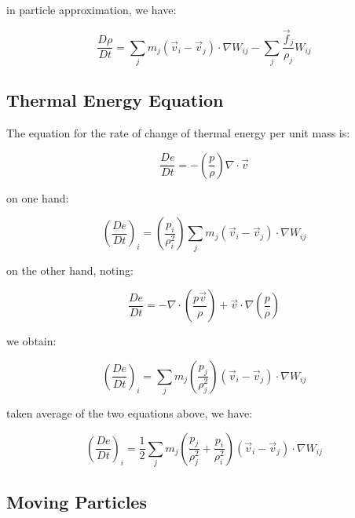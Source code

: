 \documentclass[10pt, oneside]{article}
\begin{document}
in particle approximation, we have:

\begin{equation}
    \frac{D\rho}{Dt}=\sum_j m_j (\vec{v}_i-\vec{v}_j)\cdot \nabla W_{ij}-\sum_j \frac{\vec{f}_j}{\rho_j}W_{ij}
\end{equation}

\subsection{Thermal Energy Equation}

The equation for the rate of change of thermal energy per unit mass is:

\begin{equation}
    \frac{D e}{Dt}=-\left(
        \frac{p}{\rho}
    \right)\nabla\cdot \vec{v}
\end{equation}

on one hand:

\begin{equation}
    \left(\frac{De}{Dt}\right)_i=
    \left(
        \frac{p_i}{\rho_i^2}
    \right)\sum_j
    m_j(\vec{v}_i-\vec{v}_j)\cdot \nabla W_{ij}
\end{equation}

on the other hand, noting:

\begin{equation}
    \frac{De}{Dt} = 
    -\nabla\cdot\left(
        \frac{p\vec{v}}{\rho}
    \right) + \vec{v}\cdot
    \nabla\left(
        \frac{p}{\rho}
    \right)
\end{equation}

we obtain:

\begin{equation}
    \left(\frac{De}{Dt}\right)_i=
    \sum_j m_j
    \left(
        \frac{p_j}{\rho_j^2}
    \right)(\vec{v}_i-\vec{v}_j)\cdot \nabla W_{ij}
\end{equation}

taken average of the two equations above, we have:

\begin{equation}
    \left(\frac{De}{Dt}\right)_i=
    \frac{1}{2}
    \sum_j m_j
    \left(
        \frac{p_j}{\rho_j^2}+\frac{p_i}{\rho_i^2}
    \right)(\vec{v}_i-\vec{v}_j)\cdot \nabla W_{ij}
\end{equation}

\subsection{Moving Particles}
\end{document}
